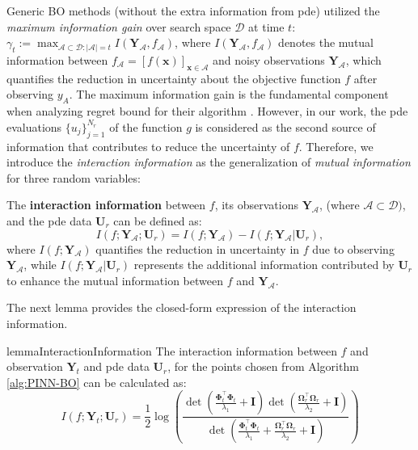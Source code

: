 Generic BO methods (without the extra information from \ac{pde}) utilized the \textit{maximum information gain} over search space $\mathcal{D}$ at time $t$:
    $\gamma_t := \max_{\mathcal{A} \subset \mathcal{D}: \lvert \mathcal{A} \rvert=t} I(\mathbf{Y}_\mathcal{A}, f_\mathcal{A})$, 
    where $I(\mathbf{Y}_\mathcal{A}, f_\mathcal{A})$ denotes the mutual information between $f_\mathcal{A} = [f(\mathbf{x})]_{\mathbf{x}\in \mathcal{A}}$ and noisy observations $\mathbf{Y}_\mathcal{A}$, which quantifies the reduction in uncertainty about the objective function $f$ after observing $y_A$. The maximum information gain is the fundamental component when analyzing regret bound for their algorithm \citep{srinivas2009gaussian,vakili2021optimal}. However, in our work, the \ac{pde} evaluations $\{u_j\}_{j=1}^{N_r}$ of the function $g$ is considered as the second source of information that contributes to reduce the uncertainty of $f$. Therefore, we introduce the \textit{interaction information} as the generalization of \textit{mutual information} for three random variables:
\begin{definition}
\label{def:pinn-bo_interaction_information}
The \textbf{interaction information} between $f$,  its observations $\mathbf{Y}_\mathcal{A}$, (where $ \mathcal{A} \subset \mathcal{D})$, and the \ac{pde} data $\mathbf{U}_r$ can be defined as:
\[
I (f; \mathbf{Y}_\mathcal{A}; \mathbf{U}_r) = I (f; \mathbf{Y}_\mathcal{A}) - I (f; \mathbf{Y}_\mathcal{A} \rvert \mathbf{U}_r),
\]
where $I(f; \mathbf{Y}_\mathcal{A})$ quantifies the reduction in uncertainty in $f$ due to observing $\mathbf{Y}_\mathcal{A}$, while $I(f; \mathbf{Y}_\mathcal{A} \rvert \mathbf{U}_r)$ represents the additional information contributed by $\mathbf{U}_r$ to enhance the mutual information between $f$ and $\mathbf{Y}_\mathcal{A}$. 
\end{definition}
The next lemma provides the closed-form expression of the interaction information. 
\begin{restatable}{lemma}{InteractionInformation} 
    \label{lemma:pinn-bo_interaction_information_formula}
    The interaction information between $f$ and observation $\mathbf{Y}_t$ and \ac{pde} data $\mathbf{U}_r$, for the points chosen from Algorithm \ref{alg:PINN-BO} can be calculated as:
    \begin{equation*}
        I (f; \mathbf{Y}_t; \mathbf{U}_r) = \frac{1}{2}  \log (\frac{\det(\frac{\boldsymbol{\Phi}_t^\top \boldsymbol{\Phi}_t}{\lambda_1} + \mathbf{I})\det(\frac{\boldsymbol{\Omega}_r^\top \boldsymbol{\Omega}_r}{\lambda_2} + \mathbf{I})}{\det(\frac{\boldsymbol{\Phi}_t^\top \boldsymbol{\Phi}_t}{\lambda_1} + \frac{\boldsymbol{\Omega}_r^\top \boldsymbol{\Omega}_r}{\lambda_2} + \mathbf{I})})
    \end{equation*}
\end{restatable}

